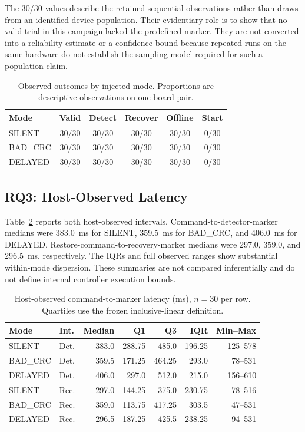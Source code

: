 \documentclass[conference]{IEEEtran}
\begin{document}
The 30/30 values describe the retained sequential observations rather than draws from an identified device population. Their evidentiary role is to show that no valid trial in this campaign lacked the predefined marker. They are not converted into a reliability estimate or a confidence bound because repeated runs on the same hardware do not establish the sampling model required for such a population claim.

\begin{table}[t]
\caption{Observed outcomes by injected mode. Proportions are descriptive observations on one board pair.}
\label{tab:outcomes}
\centering
\footnotesize
\begin{tabular}{lccccc}
\toprule
Mode & Valid & Detect & Recover & Offline & Start \\
\midrule
SILENT   & 30/30 & 30/30 & 30/30 & 30/30 & 0/30 \\
BAD\_CRC  & 30/30 & 30/30 & 30/30 & 30/30 & 0/30 \\
DELAYED  & 30/30 & 30/30 & 30/30 & 30/30 & 0/30 \\
\bottomrule
\end{tabular}
\end{table}

\subsection{RQ3: Host-Observed Latency}

Table~\ref{tab:latency} reports both host-observed intervals. Command-to-detector-marker medians were 383.0~ms for SILENT, 359.5~ms for BAD\_CRC, and 406.0~ms for DELAYED. Restore-command-to-recovery-marker medians were 297.0, 359.0, and 296.5~ms, respectively. The IQRs and full observed ranges show substantial within-mode dispersion. These summaries are not compared inferentially and do not define internal controller execution bounds.

\begin{table}[t]
\caption{Host-observed command-to-marker latency (ms), $n=30$ per row. Quartiles use the frozen inclusive-linear definition.}
\label{tab:latency}
\centering
\scriptsize
\begin{tabular}{@{}llrrrrr@{}}
\toprule
Mode & Int. & Median & Q1 & Q3 & IQR & Min--Max \\
\midrule
SILENT & Det. & 383.0 & 288.75 & 485.0 & 196.25 & 125--578 \\
BAD\_CRC & Det. & 359.5 & 171.25 & 464.25 & 293.0 & 78--531 \\
DELAYED & Det. & 406.0 & 297.0 & 512.0 & 215.0 & 156--610 \\
\midrule
SILENT & Rec. & 297.0 & 144.25 & 375.0 & 230.75 & 78--516 \\
BAD\_CRC & Rec. & 359.0 & 113.75 & 417.25 & 303.5 & 47--531 \\
DELAYED & Rec. & 296.5 & 187.25 & 425.5 & 238.25 & 94--531 \\
\bottomrule
\end{tabular}
\end{table}
\end{document}
